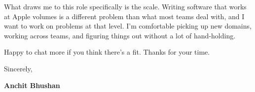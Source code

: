 \documentclass[letterpaper,11pt]{article}
\begin{document}
What draws me to this role specifically is the scale. Writing software that works at Apple volumes is a different problem than what most teams deal with, and I want to work on problems at that level. I'm comfortable picking up new domains, working across teams, and figuring things out without a lot of hand-holding.

Happy to chat more if you think there's a fit. Thanks for your time.

\vspace{12pt}

Sincerely,

\vspace{24pt}

\textbf{Anchit Bhushan}
\end{document}
